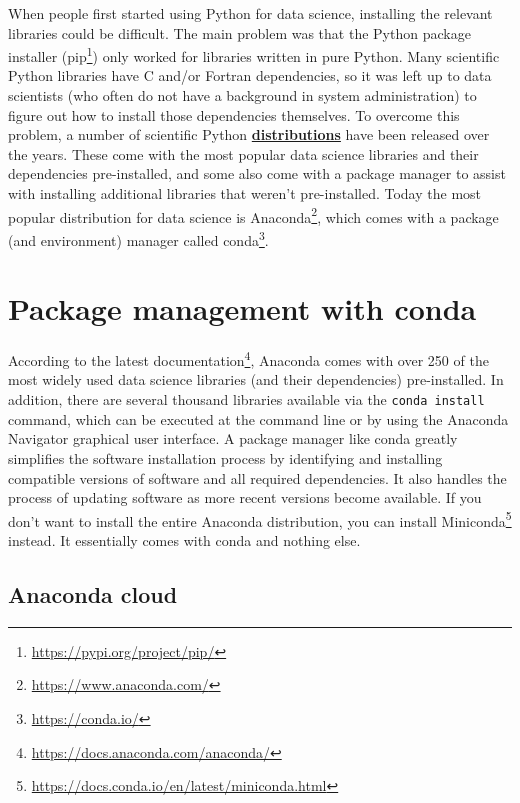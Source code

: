 \documentclass[
]{krantz}
\renewcommand{\href}[2]{#2\footnote{\url{#1}}}
\newcommand{\gref}[2]{\hyperlink{#2}{\textbf{#1}}}
\begin{document}
When people first started using Python for data science,
installing the relevant libraries could be difficult.
The main problem was that the Python package installer (\href{https://pypi.org/project/pip/}{pip})
only worked for libraries written in pure Python.
Many scientific Python libraries have C and/or Fortran dependencies,
so it was left up to data scientists
(who often do not have a background in system administration)
to figure out how to install those dependencies themselves.
To overcome this problem,
a number of scientific Python \gref{distributions}{software\_distribution}
have been released over the years.
These come with the most popular data science libraries and their dependencies pre-installed,
and some also come with a package manager to assist
with installing additional libraries that weren't pre-installed.
Today the most popular distribution for data science is \href{https://www.anaconda.com/}{Anaconda},
which comes with a package (and environment) manager called \href{https://conda.io/}{conda}.

\hypertarget{anaconda-conda-package-management}{%
\section{Package management with conda}\label{anaconda-conda-package-management}}

According to the \href{https://docs.anaconda.com/anaconda/}{latest documentation},
Anaconda comes with over 250 of the most widely used data science libraries (and their dependencies) pre-installed.
In addition, there are several thousand libraries available via the \texttt{conda\ install} command,
which can be executed at the command line or by using the Anaconda Navigator graphical user interface.
A package manager like conda greatly simplifies the software installation process
by identifying and installing compatible versions of software and all required dependencies.
It also handles the process of updating software as more recent versions become available.
If you don't want to install the entire Anaconda distribution,
you can install \href{https://docs.conda.io/en/latest/miniconda.html}{Miniconda} instead.
It essentially comes with conda and nothing else.

\hypertarget{anaconda-cloud}{%
\subsection{Anaconda cloud}\label{anaconda-cloud}}
\end{document}
